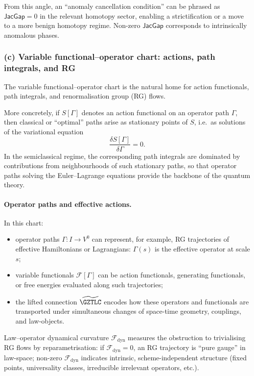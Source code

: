 \documentclass[11pt]{book}
\theoremstyle{plain}
\theoremstyle{definition}
\begin{document}
From this angle, an “anomaly cancellation condition” can be phrased as
$\mathsf{JacGap}=0$ in the relevant homotopy sector, enabling a
strictification or a move to a more benign homotopy regime. Non-zero
$\mathsf{JacGap}$ corresponds to intrinsically anomalous phases.



\subsubsection*{(c) Variable functional--operator chart: actions, path integrals, and RG}

The variable functional--operator chart is the natural home for
action functionals, path integrals, and renormalisation group (RG)
flows.

More concretely, if $S[\Gamma]$ denotes an action functional on an
operator path $\Gamma$, then classical or ``optimal'' paths arise as
stationary points of $S$, i.e.\ as solutions of the variational
equation
\[
  \frac{\delta S[\Gamma]}{\delta \Gamma} = 0.
\]
In the semiclassical regime, the corresponding path integrals are
dominated by contributions from neighbourhoods of such stationary
paths, so that operator paths solving the Euler--Lagrange equations
provide the backbone of the quantum theory.


\paragraph{Operator paths and effective actions.}

In this chart:

\begin{itemize}
  \item operator paths $\Gamma:I\to V^0$ can represent, for example,
        RG trajectories of effective Hamiltonians or Lagrangians:
        $\Gamma(s)$ is the effective operator at scale $s$;
  \item variable functionals
        $\mathcal{F}[\Gamma]$ can be action functionals,
        generating functionals, or free energies evaluated along such
        trajectories;
  \item the lifted connection $\widetilde{\GZTLC}$ encodes how these
        operators and functionals are transported under simultaneous
        changes of space-time geometry, couplings, and law-objects.
\end{itemize}

Law--operator dynamical curvature $\mathcal{F}_{\mathrm{dyn}}$
measures the obstruction to trivialising RG flows by reparametrisation:
if $\mathcal{F}_{\mathrm{dyn}}=0$, an RG trajectory is “pure gauge” in
law-space; non-zero $\mathcal{F}_{\mathrm{dyn}}$ indicates intrinsic,
scheme-independent structure (fixed points, universality classes,
irreducible irrelevant operators, etc.).
\end{document}
